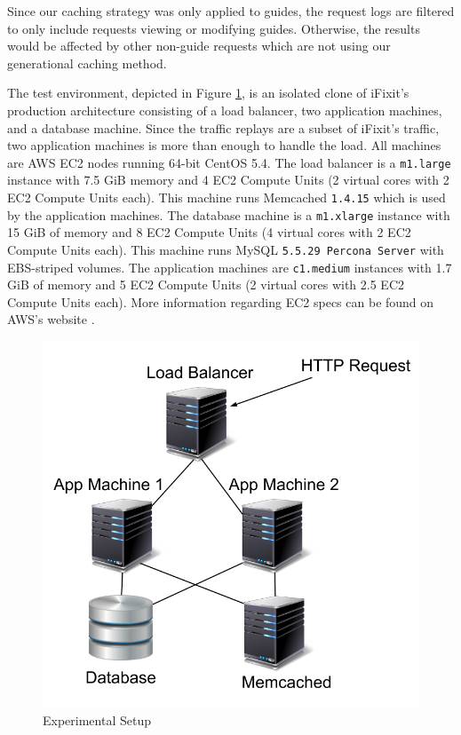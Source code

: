 \documentclass[12pt]{ucthesis}
\begin{document}
Since our caching strategy was only applied to guides, the request logs are filtered to only include requests viewing or modifying guides.
Otherwise, the results would be affected by other non-guide requests which are not using our generational caching method.

The test environment, depicted in Figure \ref{fig:experimentalArchitecture}, is an isolated clone of \textsf{iFixit}'s production architecture consisting of a load balancer, two application machines, and a database machine.
Since the traffic replays are a subset of \textsf{iFixit}'s traffic, two application machines is more than enough to handle the load.
All machines are AWS EC2 nodes running 64-bit CentOS 5.4.
The load balancer is a {\tt m1.large} instance with 7.5 GiB memory and 4 EC2 Compute Units (2 virtual cores with 2 EC2 Compute Units each).
This machine runs \textsf{Memcached} {\tt 1.4.15} which is used by the application machines.
The database machine is a {\tt m1.xlarge} instance with 15 GiB of memory and 8 EC2 Compute Units (4 virtual cores with 2 EC2 Compute Units each).
This machine runs \textsf{MySQL} {\tt 5.5.29 Percona Server} with EBS-striped volumes.
The application machines are {\tt c1.medium} instances with 1.7 GiB of memory and 5 EC2 Compute Units (2 virtual cores with 2.5 EC2 Compute Units each).
More information regarding EC2 specs can be found on AWS's website \cite{awsInstanceTypes}.

\begin{figure}[h]
\centering
\includegraphics[width=\textwidth]{assets/experimentalArchitecture.png}
\caption{Experimental Setup}
\label{fig:experimentalArchitecture}
\end{figure}
\end{document}
